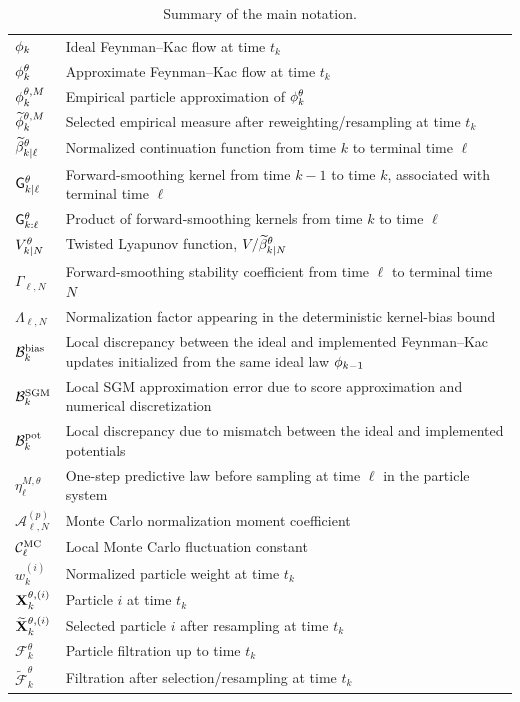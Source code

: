 \documentclass[11pt]{article}
\theoremstyle{plain}
\theoremstyle{definition}
\theoremstyle{remark}
\begin{document}
\begin{table}[ht]
\begin{tabularx}{\textwidth}{@{}l>{\raggedright\arraybackslash}X@{}}
    $\filter{k}$ & Ideal Feynman--Kac flow at time $t_k$ \\
    $\approxfilter{k}$ & Approximate Feynman--Kac flow at time $t_k$ \\
    $\mcfilter{k}$ & Empirical particle approximation of $\approxfilter{k}$ \\
    $\tildemcfilter{k}$ & Selected empirical measure after reweighting/resampling at time $t_k$ \\
    $\normbackwardfun{k}{\ell}[\theta]$ & Normalized continuation function from time $k$ to terminal time $\ell$ \\
    $\fsmk{k}{\ell}[\theta]$ & Forward-smoothing kernel from time $k-1$ to time $k$, associated with terminal time $\ell$ \\
    $\prodfsmk{k}{\ell}[\theta]$ & Product of forward-smoothing kernels from time $k$ to time $\ell$ \\
    $\twistedlyap{k}{N}[\theta]$ & Twisted Lyapunov function, $V/\normbackwardfun{k}{N}[\theta]$ \\
    $\Gamma_{\ell,N}$ & Forward-smoothing stability coefficient from time $\ell$ to terminal time $N$ \\
    $\Lambda_{\ell,N}$ & Normalization factor appearing in the deterministic kernel-bias bound \\
    $\mathcal B_k^{\rm bias}$ & Local discrepancy between the ideal and implemented Feynman--Kac updates initialized from the same ideal law $\filter{k-1}$ \\ 
    $\mathcal B_k^{\rm SGM}$ & Local SGM approximation error due to score approximation and numerical discretization \\ 
    $\mathcal B_k^{\rm pot}$ & Local discrepancy due to mismatch between the ideal and implemented potentials \\


    $\eta_\ell^{M,\theta}$ & One-step predictive law before sampling at time $\ell$ in the particle system \\
    $\mathcal A_{\ell,N}^{(p)}$ & Monte Carlo normalization moment coefficient \\
    $\mathcal{C}_\ell^{\rm MC}$ & Local Monte Carlo fluctuation constant \\
    $w_k^{(i)}$ & Normalized particle weight at time $t_k$ \\
    $\mathbf{X}_k^{\theta,(i)}$ & Particle $i$ at time $t_k$ \\
    $\widetilde {\mathbf{X}}_k^{\theta,(i)}$ & Selected particle $i$ after resampling at time $t_k$ \\
    $\mathcal F_k^\theta$ & Particle filtration up to time $t_k$ \\
    $\widetilde{\mathcal F}_k^\theta$ & Filtration after selection/resampling at time $t_k$ \\
    \bottomrule
    \end{tabularx}

    \caption{Summary of the main notation.}
    \label{tab:notation_summary}
\end{table}
\end{document}
